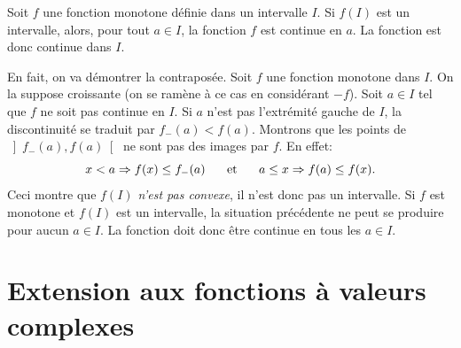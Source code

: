 \begin{thm}
 Soit $f$ une fonction monotone définie dans un intervalle $I$. Si $f(I)$ est un intervalle, alors, pour tout $a\in I$, la fonction $f$ est continue en $a$. La fonction est donc continue dans $I$.
\end{thm}
\begin{demo}
En fait, on va démontrer la contraposée. Soit $f$ une fonction monotone dans $I$. On la suppose croissante (on se ramène à ce cas en considérant $-f$). Soit $a\in I$ tel que $f$ ne soit pas continue en $I$.\newline
Si $a$ n'est pas l'extrémité gauche de $I$, la discontinuité se traduit par $f_-(a) < f(a)$. Montrons que les points de $\left] f_-(a),f(a)\right[$ ne sont pas des images par $f$.
En effet:
\[
 x < a \Rightarrow f(x) \leq f_-(a) \hspace{0.5cm}\text{ et }\hspace{0.5cm} a \leq x \Rightarrow f(a) \leq f(x).
\]
Ceci montre que \emph{$f(I)$ n'est pas convexe}, il n'est donc pas un intervalle.\newline
Si $f$ est monotone et $f(I)$ est un intervalle, la situation précédente ne peut se produire pour aucun $a\in I$. La fonction doit donc être continue en tous les $a\in I$.
\end{demo}

\section{Extension aux fonctions à valeurs complexes}
